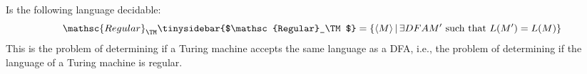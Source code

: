 Is the following language decidable:
\[
\mathsc{Regular}_\TM
\tinysidebar{$\mathsc{Regular}_\TM$}\index{regular$\mathsc{Regular}_\TM$}
=
\{
\langle M \rangle
\,|\, \exists DFA M' \text{ such that } L(M') =  L(M)
\}
\]
This is the problem of determining if a Turing machine
accepts the same language as a DFA, i.e., the problem of
determining if the language of a Turing machine is regular.
